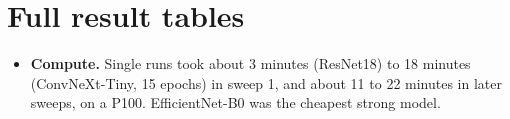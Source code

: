 \documentclass[11pt]{article}
\begin{document}
\section{Full result tables}
\begin{table}[h]
\centering\footnotesize
\setlength{\tabcolsep}{3pt}
\resizebox{\linewidth}{!}{}
\caption{Sweep 1: 13 configurations, plain recipe, 15 epochs, validation-based epoch selection. Params = total parameters of both branches. ``TTA AUC'' = with horizontal-flip test-time averaging.}
\label{tab:sweep1}
\end{table}

\begin{table}[h]
\centering\footnotesize
\setlength{\tabcolsep}{3pt}
\resizebox{\linewidth}{!}{}
\caption{Sweep 3: EfficientNet-B0 regularisation and backbone neighbours, 25 epochs unless stated. The drop-path configuration had the best validation AUC (0.852) and was used for the train+val and 5-fold runs (Appendix~\ref{app:ens}).}
\label{tab:sweep3}
\end{table}

\begin{itemize}
\item \textbf{Compute.} Single runs took about 3 minutes (ResNet18) to 18 minutes (ConvNeXt-Tiny, 15 epochs) in sweep 1, and about 11 to 22 minutes in later sweeps, on a P100. EfficientNet-B0 was the cheapest strong model.
\end{itemize}
\end{document}
